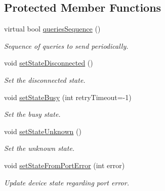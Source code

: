 \subsection*{Protected Member Functions}
\begin{DoxyCompactItemize}
\item 
virtual bool \hyperlink{classmdt_device_acba50968d201ad95c4eaa2ab2ed48b4f}{queriesSequence} ()
\begin{DoxyCompactList}\small\item\em Sequence of queries to send periodically. \end{DoxyCompactList}\item 
void \hyperlink{classmdt_device_ac3df06706c79730fde70ee6131af577c}{setStateDisconnected} ()
\begin{DoxyCompactList}\small\item\em Set the disconnected state. \end{DoxyCompactList}\item 
void \hyperlink{classmdt_device_abf01ab213b91df9ff03ad6b7184abf88}{setStateBusy} (int retryTimeout=-\/1)
\begin{DoxyCompactList}\small\item\em Set the busy state. \end{DoxyCompactList}\item 
void \hyperlink{classmdt_device_a312bf413dfc16765328843f3fe08a4b8}{setStateUnknown} ()
\begin{DoxyCompactList}\small\item\em Set the unknown state. \end{DoxyCompactList}\item 
void \hyperlink{classmdt_device_ab77eb4c1bb50201e97a4dbd8b538659a}{setStateFromPortError} (int error)
\begin{DoxyCompactList}\small\item\em Update device state regarding port error. \end{DoxyCompactList}\end{DoxyCompactItemize}
